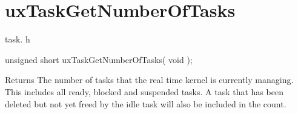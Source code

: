\hypertarget{group__ux_task_get_number_of_tasks}{\section{ux\-Task\-Get\-Number\-Of\-Tasks}
\label{group__ux_task_get_number_of_tasks}
}
task. h 
\begin{DoxyPre}unsigned short uxTaskGetNumberOfTasks( void );\end{DoxyPre}


\begin{DoxyReturn}{Returns}
The number of tasks that the real time kernel is currently managing. This includes all ready, blocked and suspended tasks. A task that has been deleted but not yet freed by the idle task will also be included in the count. 
\end{DoxyReturn}
